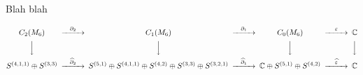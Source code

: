 \documentclass[final,xcolor=svgnames]{beamer}
\begin{document}
\begin{frame}{}
  \vfill

  \begin{block}{Blah blah}
    \begin{tiny}
    \[
    \begin{CD}
      C_{2}(M_{6}) @>{\partial_{2}}>> C_{1}(M_{6}) @>{\partial_{1}}>> C_{0}(M_{6}) @>{\varepsilon}>> \mathbb{C}\\
      @VVV   @VVV   @VVV   @VVV    \\
      S^{(4,1,1)}\oplus S^{(3,3)} @>{\widehat\partial_{2}}>>
      S^{(5,1)}\oplus S^{(4,1,1)}\oplus S^{(4,2)}\oplus S^{(3,3)}\oplus S^{(3,2,1)} @>{\widehat\partial_{1}}>> 
      \mathbb{C} \oplus S^{(5,1)}\oplus S^{(4,2)} @>{\widehat \varepsilon}>>  \mathbb{C}
    \end{CD}
    \]
    \end{tiny}
  \end{block}
\end{frame}
\end{document}

